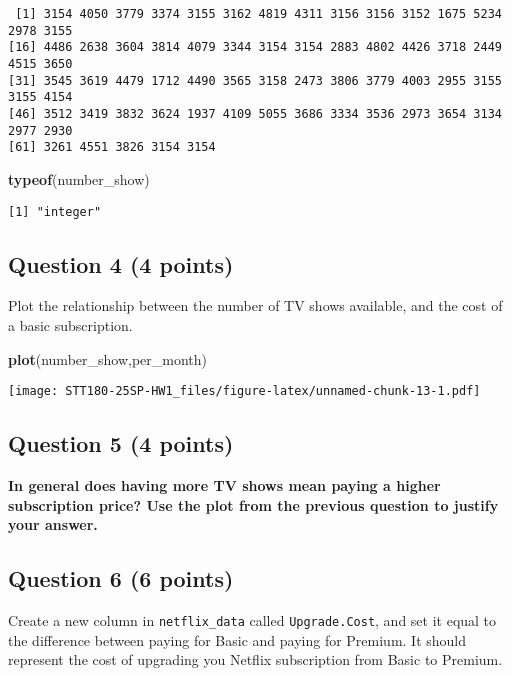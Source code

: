 \documentclass[
]{article}
\newenvironment{Shaded}{\begin{snugshade}}{\end{snugshade}}
\newcommand{\FunctionTok}[1]{\textcolor[rgb]{0.13,0.29,0.53}{\textbf{#1}}}
\newcommand{\NormalTok}[1]{#1}
\begin{document}
\begin{verbatim}
 [1] 3154 4050 3779 3374 3155 3162 4819 4311 3156 3156 3152 1675 5234 2978 3155
[16] 4486 2638 3604 3814 4079 3344 3154 3154 2883 4802 4426 3718 2449 4515 3650
[31] 3545 3619 4479 1712 4490 3565 3158 2473 3806 3779 4003 2955 3155 3155 4154
[46] 3512 3419 3832 3624 1937 4109 5055 3686 3334 3536 2973 3654 3134 2977 2930
[61] 3261 4551 3826 3154 3154
\end{verbatim}

\begin{Shaded}
\begin{Highlighting}[]
\FunctionTok{typeof}\NormalTok{(number\_show)}
\end{Highlighting}
\end{Shaded}

\begin{verbatim}
[1] "integer"
\end{verbatim}

\subsection{Question 4 (4 points)}\label{question-4-4-points}

Plot the relationship between the number of TV shows available, and the
cost of a basic subscription.

\begin{Shaded}
\begin{Highlighting}[]
\FunctionTok{plot}\NormalTok{(number\_show,per\_month)}
\end{Highlighting}
\end{Shaded}

\texttt{[image: STT180-25SP-HW1\_files/figure-latex/unnamed-chunk-13-1.pdf]}

\subsection{Question 5 (4 points)}\label{question-5-4-points}

\textbf{In general does having more TV shows mean paying a higher
subscription price? Use the plot from the previous question to justify
your answer.}

\subsection{Question 6 (6 points)}\label{question-6-6-points}

Create a new column in \texttt{netflix\_data} called
\texttt{Upgrade.Cost}, and set it equal to the difference between paying
for Basic and paying for Premium. It should represent the cost of
upgrading you Netflix subscription from Basic to Premium.
\end{document}
